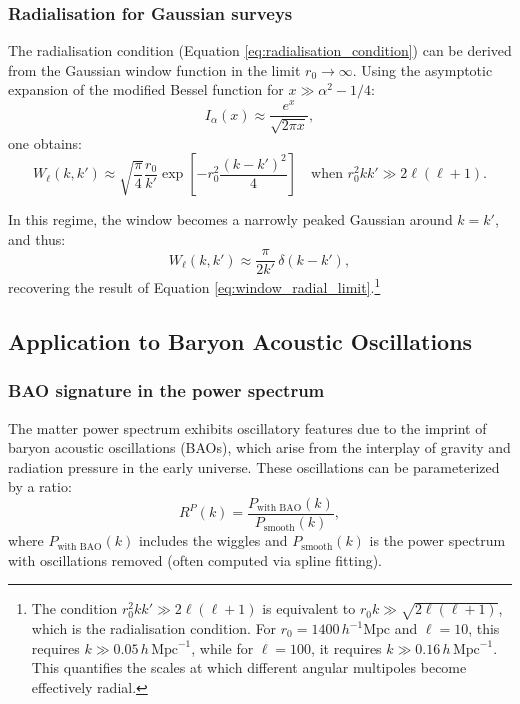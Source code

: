 \subsubsection{Radialisation for Gaussian surveys}

The radialisation condition (Equation \ref{eq:radialisation_condition}) can be derived from the Gaussian window
function in the limit $r_0\to\infty$. Using the asymptotic expansion of the modified Bessel function for $x\gg\alpha^2-1/4$:
\begin{equation}
I_\alpha(x) \approx \frac{e^x}{\sqrt{2\pi x}},
\label{eq:bessel_asymptotic}
\end{equation}
one obtains:
\begin{equation}
W_\ell(k,k') \approx \sqrt{\frac{\pi}{4}}\frac{r_0}{k'}
\exp\left[-r_0^2\frac{(k-k')^2}{4}\right]
\quad \text{when } r_0^2 k k' \gg 2\ell(\ell+1).
\label{eq:window_gaussian_radial_limit}
\end{equation}

In this regime, the window becomes a narrowly peaked Gaussian around $k=k'$, and thus:
\begin{equation}
W_\ell(k,k') \approx \frac{\pi}{2k'}\,\delta(k-k'),
\label{eq:window_dirac_limit}
\end{equation}
recovering the result of Equation \ref{eq:window_radial_limit}.\footnote{The condition $r_0^2 k k' \gg 2\ell(\ell+1)$
is equivalent to $r_0 k \gg \sqrt{2\ell(\ell+1)}$, which is the radialisation condition. For $r_0=1400\,h^{-1}\text{Mpc}$
and $\ell=10$, this requires $k \gg 0.05\,h\,\text{Mpc}^{-1}$, while for $\ell=100$, it requires $k\gg 0.16\,h\,\text{Mpc}^{-1}$.
This quantifies the scales at which different angular multipoles become effectively radial.}

\subsection{Application to Baryon Acoustic Oscillations}

\subsubsection{BAO signature in the power spectrum}

The matter power spectrum exhibits oscillatory features due to the imprint of baryon acoustic oscillations (BAOs),
which arise from the interplay of gravity and radiation pressure in the early universe. These oscillations can be
parameterized by a ratio:
\begin{equation}
R^P(k) = \frac{P_{\text{with BAO}}(k)}{P_{\text{smooth}}(k)},
\label{eq:bao_ratio_fourier}
\end{equation}
where $P_{\text{with BAO}}(k)$ includes the wiggles and $P_{\text{smooth}}(k)$ is the power spectrum with oscillations
removed (often computed via spline fitting).

